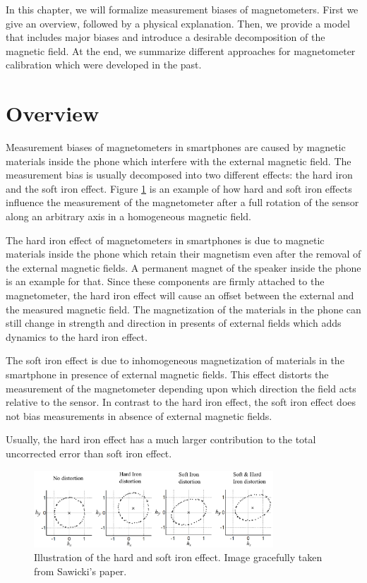 In this chapter, we will formalize measurement biases of magnetometers. First we give an overview, followed by a physical explanation. Then, we provide a model that includes major biases and introduce a desirable decomposition of the magnetic field. At the end, we summarize different approaches for magnetometer calibration which were developed in the past.

\section{Overview}

Measurement biases of magnetometers in smartphones are caused by magnetic materials inside the phone which interfere with the external magnetic field. The measurement bias is usually decomposed into two different effects: the hard iron and the soft iron effect. Figure \ref{fig:hard_soft_iron} is an example of how hard and soft iron effects influence the measurement of the magnetometer after a full rotation of the sensor along an arbitrary axis in a homogeneous magnetic field.

The hard iron effect of magnetometers in smartphones is due to magnetic materials inside the phone which retain their magnetism even after the removal of the external magnetic fields. A permanent magnet of the speaker inside the phone is an example for that. Since these components are firmly attached to the magnetometer, the hard iron effect will cause an offset between the external and the measured magnetic field. The magnetization of the materials in the phone can still change in strength and direction in presents of external fields which adds dynamics to the hard iron effect.

The soft iron effect is due to inhomogeneous magnetization of materials in the smartphone in presence of external magnetic fields. This effect distorts the measurement of the magnetometer depending upon which direction the field acts relative to the sensor. In contrast to the hard iron effect, the soft iron effect does not bias measurements in absence of external magnetic fields.

Usually, the hard iron effect has a much larger contribution to the total uncorrected error than soft iron effect.\cite{vectornav}

\begin{figure}[hbt!]
    \centering
    \includegraphics[width=0.8\textwidth]{figures/hard_soft_iron.jpg}
    \caption{Illustration of the hard and soft iron effect. Image gracefully taken from Sawicki's paper.\cite{hard_soft_iron}}
    \label{fig:hard_soft_iron}
\end{figure}

